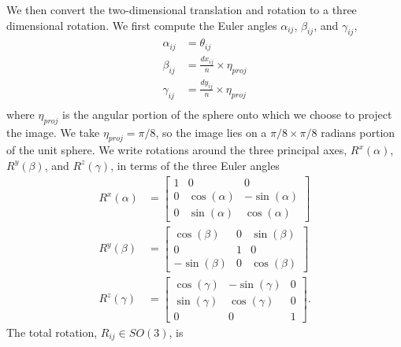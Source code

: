 \documentclass{pnastwo}
\begin{document}
\begin{article}
\begin{materials}
%
%
We then convert the two-dimensional translation and rotation to a three dimensional rotation. 
%
We first compute the Euler angles $\alpha_{ij}$, $\beta_{ij}$, and $\gamma_{ij}$,
\begin{equation} \label{eq:angle_relations}
\begin{aligned}
	\alpha_{ij} &= \theta_{ij} \\
	\beta_{ij} &= \frac{dx_{ij}}{n} \times \eta_{proj} \\
	\gamma_{ij} &= \frac{dy_{ij}}{n} \times \eta_{proj} \\
\end{aligned}
\end{equation}
where $\eta_{proj}$ is the angular portion of the sphere onto which we choose to project the image.
%
We take $\eta_{proj} =  \pi/8$, so the image lies on a $\pi/8 \times \pi/8$ radians portion of the unit sphere.
%
We write rotations around the three principal axes, $R^x(\alpha)$, $R^y(\beta)$, and $R^z(\gamma)$, in terms of the three Euler angles
\begin{equation}
\begin{aligned}
	R^x(\alpha) &= \begin{bmatrix}
	1 & 0 & 0 \\
    0 & \cos(\alpha) & -\sin(\alpha) \\
    0 & \sin(\alpha) & \cos(\alpha)
	\end{bmatrix} \\
	R^y(\beta) &= \begin{bmatrix}
	\cos(\beta) & 0 & \sin(\beta) \\
    0 & 1 & 0 \\
    -\sin(\beta) & 0 & \cos(\beta)
    \end{bmatrix} \\
	R^z(\gamma) &= \begin{bmatrix} 
	\cos(\gamma) & -\sin(\gamma) & 0 \\
    \sin(\gamma) & \cos(\gamma) & 0 \\
    0 & 0 & 1 
    \end{bmatrix}.
\end{aligned}
\end{equation}
%
The total rotation, $R_{ij} \in SO(3)$, is 
\begin{equation} \label{eq:total_rot}

\end{equation}
\end{materials}
\end{article}
\end{document}
